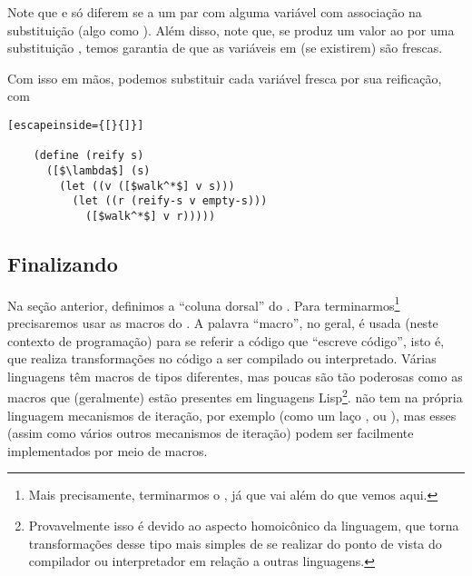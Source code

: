 \documentclass{article}
\begin{document}
  Note que  e  só diferem se
    a um par com alguma
  variável com associação na substituição  (algo como
  ). Além disso,
  note que, se  produz um valor  ao
   por uma substituição , temos
  garantia de que as variáveis em  (se existirem) são frescas.

  Com isso em mãos, podemos substituir cada variável fresca por sua
  reificação, com

  \begin{lstlisting}[escapeinside={[}{]}]

    (define (reify s)
      ([$\lambda$] (s)
        (let ((v ([$walk^*$] v s)))
          (let ((r (reify-s v empty-s)))
            ([$walk^*$] v r)))))

  \end{lstlisting}



  \subsection{Finalizando}

  Na seção anterior, definimos a ``coluna dorsal'' do
  . Para terminarmos\footnote{Mais precisamente,
    terminarmos o , já que  vai
    além do que vemos aqui.} precisaremos usar as macros do
  . A palavra
  ``macro'', no geral, é usada (neste contexto de programação) para se
  referir a código que ``escreve código'', isto é, que realiza
  transformações no código a ser compilado ou interpretado. Várias
  linguagens têm macros de tipos diferentes, mas
  poucas são tão poderosas como as macros que (geralmente) estão
  presentes
  em linguagens Lisp\footnote{Provavelmente isso é devido ao aspecto
    homoicônico da linguagem, que torna transformações desse tipo mais
    simples de se realizar do ponto de vista do compilador ou
    interpretador em relação a outras linguagens.}. 
  não tem na própria linguagem
  mecanismos de iteração, por exemplo (como um laço ,
  ou ), mas esses (assim como vários outros
  mecanismos de iteração) podem ser facilmente implementados por meio
  de macros.
\end{document}
